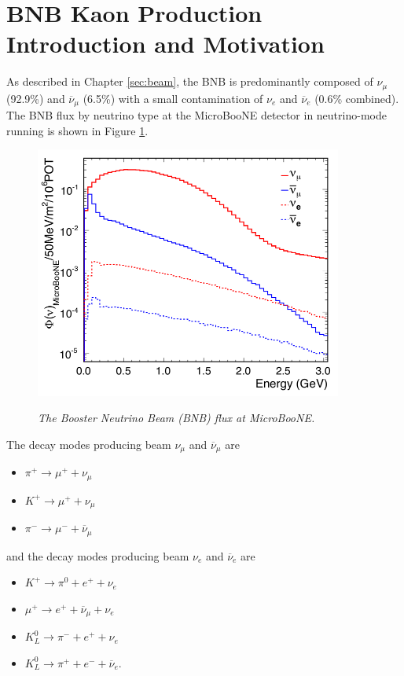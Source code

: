 \section{BNB Kaon Production Introduction and Motivation}
As described in Chapter \ref{sec:beam}, the BNB is predominantly composed of $\nu_\mu$ (92.9\%) and $\overline{\nu}_\mu$ (6.5\%) with a small contamination of $\nu_e$ and $\overline{\nu}_e$ (0.6\% combined). The BNB flux by neutrino type at the MicroBooNE detector in neutrino-mode running is shown in Figure \ref{BNB_flux_uboone_fig}.

\begin{figure}[ht!]
\centering
	\includegraphics[width=0.9\textwidth]{Figures/BNB_flux_uboone.png} \\
\caption{\textit{The Booster Neutrino Beam (BNB) flux at MicroBooNE.}}\label{BNB_flux_uboone_fig}
\end{figure}

The decay modes producing beam $\nu_\mu$ and $\overline{\nu}_\mu$ are
\begin{itemize}
	\item $\pi^+\rightarrow\mu^++\nu_\mu$
	\item $K^+\rightarrow\mu^++\nu_\mu$
	\item $\pi^-\rightarrow\mu^-+\overline{\nu}_\mu$
\end{itemize}
and the decay modes producing beam $\nu_e$ and $\overline{\nu}_e$ are
\begin{itemize}
	\item $K^+ \rightarrow \pi^0 + e^+ + \nu_e$
	\item $\mu^+ \rightarrow e^+ + \overline{\nu}_\mu + \nu_e$
	\item $K^0_L \rightarrow \pi^- + e^+ + \nu_e$
	\item $K^0_L \rightarrow \pi^+ + e^- + \overline{\nu}_e$.
\end{itemize}

